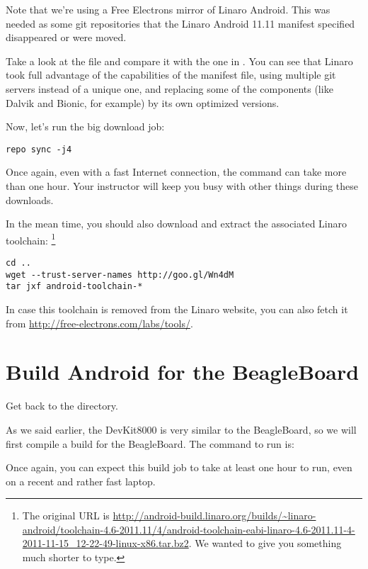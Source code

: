 Note that we're using a Free Electrons mirror of Linaro Android. This
was needed as some git repositories that the Linaro Android 11.11 manifest
specified disappeared or were moved. 

Take a look at the  file and compare it with
the one in . You can see that
Linaro took full advantage of the capabilities of the manifest file,
using multiple git servers instead of a unique one, and replacing some
of the components (like Dalvik and Bionic, for example) by its own
optimized versions.

Now, let's run the big download job:
\begin{verbatim}
repo sync -j4
\end{verbatim}

Once again, even with a fast Internet connection, the 
command can take more than one hour. Your instructor will keep you
busy with other things during these downloads.

In the mean time, you should also download and extract the associated
Linaro toolchain: \footnote{The original URL is
  \url{http://android-build.linaro.org/builds/~linaro-android/toolchain-4.6-2011.11/4/android-toolchain-eabi-linaro-4.6-2011.11-4-2011-11-15_12-22-49-linux-x86.tar.bz2}. We
  wanted to give you something much shorter to type.}
\begin{verbatim}
cd ..
wget --trust-server-names http://goo.gl/Wn4dM
tar jxf android-toolchain-*
\end{verbatim}

In case this toolchain is removed from the Linaro website, you can also
fetch it from \url{http://free-electrons.com/labs/tools/}.

\section{Build Android for the BeagleBoard}

Get back to the  directory.

As we said earlier, the DevKit8000 is very similar to the BeagleBoard,
so we will first compile a build for the BeagleBoard. The command to
run is:


Once again, you can expect this build job to take at least one hour to
run, even on a recent and rather fast laptop.

